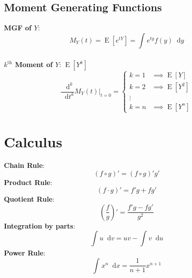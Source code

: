 \documentclass[12pt]{article}
\newcommand{\defn}[1]{\textbf{#1}:}
\newcommand{\expt}[1]{\operatorname{E}[#1]}
\newcommand*\diff{\mathop{}\!\mathrm{d}}
\newcommand{\drv}[3]{\frac{\diff#1^{#3}}{\diff#2^{#3}}}
\newcommand{\intv}[4]{\int_{#3}^{#4} #1 \diff #2}
\begin{document}
\subsection{Moment Generating Functions}
\defn{MGF of $Y$} \[
    M_Y(t) = \expt{e^{tY}} = \intv{e^{ty}f(y)}{y}{}{}
\]\\
\defn{$k^{\text{th}}$ Moment of $Y$} $\expt{Y^k}$\\
\[
    \drv{}{t}{k}M_Y(t)\bigg\rvert_{t=0} = \begin{cases}
        k = 1 & \implies \expt{Y}\\
        k = 2 & \implies  \expt{Y^2}\\
        \vdots\\
        k = n & \implies \expt{Y^n}
    \end{cases}
\]
\section{Calculus}
\defn{Chain Rule} \[
    (f\circ g)' = (f\circ g)'g'
\]
\defn{Product Rule} \[
    (f\cdot g)' = f'g + fg'
\]
\defn{Quotient Rule} \[
    \left(\frac{f}{g}\right)' = \frac{f'g-fg'}{g^2}
\]
\defn{Integration by parts} \[
    \intv{u}{v}{}{} = uv - \intv{v}{u}{}{}
\]
\defn{Power Rule} \[
    \intv{x^n}{x}{}{} = \frac{1}{n+1}x^{n+1}
\]
\end{document}

